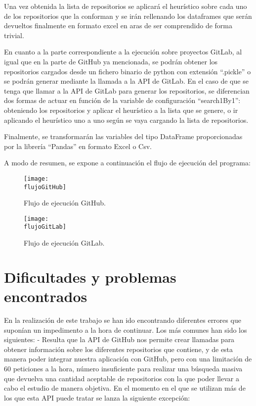 Una vez obtenida la lista de repositorios se aplicará el heurístico sobre cada uno de los repositorios que la conforman y se irán rellenando los dataframes que serán devueltos finalmente en formato excel en aras de ser comprendido de forma trivial.

En cuanto a la parte correspondiente a la ejecución sobre proyectos GitLab, al igual que en la parte de GitHub ya mencionada, se podrán obtener los repositorios cargados desde un fichero binario de python con extensión ``.pickle'' o se podrán generar mediante la llamada a la API de GitLab. En el caso de que se tenga que llamar a la API de GitLab para generar los repositorios, se diferencian dos formas de actuar en función de la variable de configuración ``search1By1'': obteniendo los repositorios y aplicar el heurístico a la lista que se genere, o ir aplicando el heurístico uno a uno según se vaya cargando la lista de repositorios.

Finalmente, se transformarán las variables del tipo DataFrame proporcionadas por la librería ``Pandas'' en formato Excel o Csv.

A modo de resumen, se expone a continuación el flujo de ejecución del programa:

\begin{figure}[h]
    \centering
    \texttt{[image: \\flujoGitHub]}
    \caption{Flujo de ejecución GitHub.}
\end{figure}

\begin{figure}[h]
    \centering
    \texttt{[image: \\flujoGitLab]}
    \caption{Flujo de ejecución GitLab.}
\end{figure}

\section{Dificultades y problemas encontrados}
En la realización de este trabajo se han ido encontrando diferentes errores que suponían un impedimento a la hora de continuar. Los más comunes han sido los siguientes:
- Resulta que la API de GitHub nos permite crear llamadas para obtener información sobre los diferentes repositorios que contiene, y de esta manera poder integrar nuestra aplicación con GitHub, pero con una limitación de 60 peticiones a la hora, número insuficiente para realizar una búsqueda masiva que devuelva una cantidad aceptable de repositorios con la que poder llevar a cabo el estudio de manera objetiva. En el momento en el que se utilizan más de los que esta API puede tratar se lanza la siguiente excepción: 


